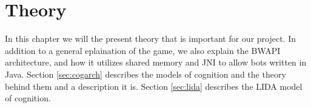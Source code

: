 
\chapter{Theory}
In this chapter we will the present theory that is important for our project.
In addition to a general eplaination of the game, we also explain the BWAPI architecture, and how it utilizes shared memory
and JNI to allow bots written in Java. Section \ref{sec:cogarch} describes the
models of cognition and the theory
behind them and a description it is.
Section \ref{sec:lida} describes the LIDA model of cognition.

%

